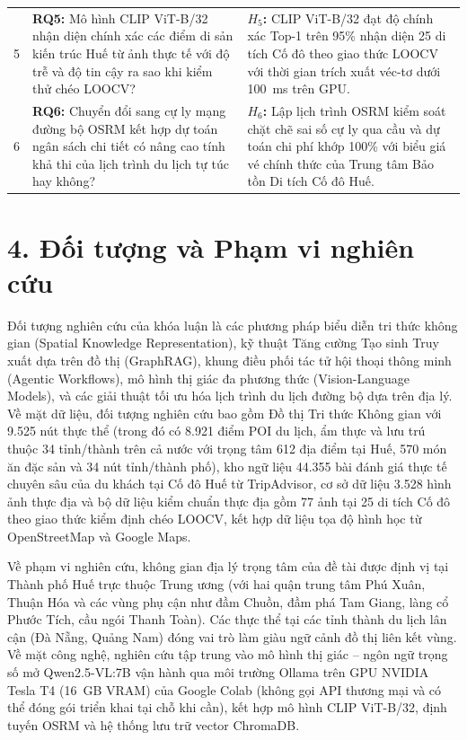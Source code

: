 \begin{table}[htbp]
\begin{tabularx}{\textwidth}{c X X}
5 & \textbf{RQ5:} Mô hình CLIP ViT-B/32 nhận diện chính xác các điểm di sản kiến trúc Huế từ ảnh thực tế với độ trễ và độ tin cậy ra sao khi kiểm thử chéo LOOCV? & \textbf{$H_5$:} CLIP ViT-B/32 đạt độ chính xác Top-1 trên 95\% nhận diện 25 di tích Cố đô theo giao thức LOOCV với thời gian trích xuất véc-tơ dưới 100~ms trên GPU. \\
6 & \textbf{RQ6:} Chuyển đổi sang cự ly mạng đường bộ OSRM kết hợp dự toán ngân sách chi tiết có nâng cao tính khả thi của lịch trình du lịch tự túc hay không? & \textbf{$H_6$:} Lập lịch trình OSRM kiểm soát chặt chẽ sai số cự ly qua cầu và dự toán chi phí khớp 100\% với biểu giá vé chính thức của Trung tâm Bảo tồn Di tích Cố đô Huế. \\
\hline
\end{tabularx}
\end{table}

\section*{4. Đối tượng và Phạm vi nghiên cứu}
{}

Đối tượng nghiên cứu của khóa luận là các phương pháp biểu diễn tri thức không gian (Spatial Knowledge Representation), kỹ thuật Tăng cường Tạo sinh Truy xuất dựa trên đồ thị (GraphRAG), khung điều phối tác tử hội thoại thông minh (Agentic Workflows), mô hình thị giác đa phương thức (Vision-Language Models), và các giải thuật tối ưu hóa lịch trình du lịch đường bộ dựa trên địa lý. Về mặt dữ liệu, đối tượng nghiên cứu bao gồm Đồ thị Tri thức Không gian với 9.525 nút thực thể (trong đó có 8.921 điểm POI du lịch, ẩm thực và lưu trú thuộc 34 tỉnh/thành trên cả nước với trọng tâm 612 địa điểm tại Huế, 570 món ăn đặc sản và 34 nút tỉnh/thành phố), kho ngữ liệu 44.355 bài đánh giá thực tế chuyên sâu của du khách tại Cố đô Huế từ TripAdvisor, cơ sở dữ liệu 3.528 hình ảnh thực địa và bộ dữ liệu kiểm chuẩn thực địa gồm 77 ảnh tại 25 di tích Cố đô theo giao thức kiểm định chéo LOOCV, kết hợp dữ liệu tọa độ hình học từ OpenStreetMap và Google Maps.

Về phạm vi nghiên cứu, không gian địa lý trọng tâm của đề tài được định vị tại Thành phố Huế trực thuộc Trung ương (với hai quận trung tâm Phú Xuân, Thuận Hóa và các vùng phụ cận như đầm Chuồn, đầm phá Tam Giang, làng cổ Phước Tích, cầu ngói Thanh Toàn). Các thực thể tại các tỉnh thành du lịch lân cận (Đà Nẵng, Quảng Nam) đóng vai trò làm giàu ngữ cảnh đồ thị liên kết vùng. Về mặt công nghệ, nghiên cứu tập trung vào mô hình thị giác -- ngôn ngữ trọng số mở Qwen2.5-VL:7B vận hành qua môi trường Ollama trên GPU NVIDIA Tesla T4 (16~GB VRAM) của Google Colab (không gọi API thương mại và có thể đóng gói triển khai tại chỗ khi cần), kết hợp mô hình CLIP ViT-B/32, định tuyến OSRM và hệ thống lưu trữ vector ChromaDB.

